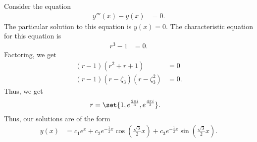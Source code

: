 \documentclass[10pt]{mypackage}
\begin{document}
\begin{example}
  Consider the equation
  \begin{align*}
    y'''(x) - y(x) &= 0.
  \end{align*}
  The particular solution to this equation is $y(x) = 0$. The characteristic equation for this equation is
  \begin{align*}
    r^3 - 1 &= 0.
  \end{align*}
  Factoring, we get
  \begin{align*}
    \left(r-1\right)\left(r^2 + r + 1\right) &=0\\
    \left(r-1\right)\left(r-\zeta_3\right)\left(r-\zeta_3^2\right) &= 0.
  \end{align*}
  Thus, we get
  \begin{align*}
    r &= \set{1, e^{\frac{2\pi i}{3}}, e^{\frac{4\pi i}{3}}}.
  \end{align*}
  Thus, our solutions are of the form
  \begin{align*}
    y(x) &= c_1e^{x} + c_2e^{-\frac{1}{2}x}\cos\left(\frac{\sqrt{3}}{2}x\right) + c_3e^{-\frac{1}{2}x}\sin\left(\frac{\sqrt{3}}{2}x\right).
  \end{align*}
\end{example}
\end{document}
